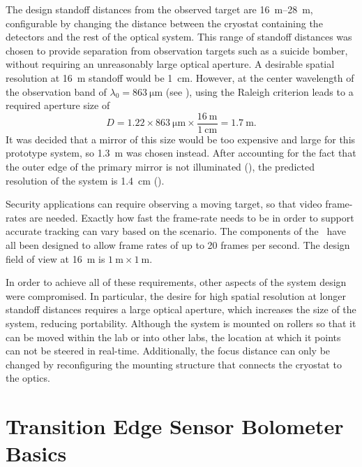 The design standoff distances from the observed target are \SIrange{16}{28}{\m}, configurable by changing the distance between the cryostat containing the detectors and the rest of the optical system.
This range of standoff distances was chosen to provide separation from observation targets such as a suicide bomber, without requiring an unreasonably large optical aperture.
A desirable spatial resolution at \SI{16}{\m} standoff would be \SI{1}{\cm}.
However, at the center wavelength of the observation band of $\lambda_0 = \SI{863}{\um}$ (see ), using the Raleigh criterion  leads to a required aperture size of
\begin{equation}
  D = 1.22 \times \SI{863}{\um} \times \frac{\SI{16}{\m}}{\SI{1}{\cm}} = \SI{1.7}{\m}.
\end{equation}
It was decided that a mirror of this size would be too expensive and large for this prototype system, so \SI{1.3}{\m} was chosen instead.
After accounting for the fact that the outer edge of the primary mirror is not illuminated (), the predicted resolution of the system is \SI{1.4}{\cm} ().

Security applications can require observing a moving target, so that video frame-rates are needed.
Exactly how fast the frame-rate needs to be in order to support accurate tracking can vary based on the scenario.
The components of the \Imager\ have all been designed to allow frame rates of up to 20 frames per second.
The design field of view at \SI{16}{\m} is $\SI{1}{\m} \times \SI{1}{\m}$.

In order to achieve all of these requirements, other aspects of the system design were compromised.
In particular, the desire for high spatial resolution at longer standoff distances requires a large optical aperture, which increases the size of the system, reducing portability.
Although the system is mounted on rollers so that it can be moved within the lab or into other labs, the location at which it points can not be steered in real-time.
Additionally, the focus distance can only be changed by reconfiguring the mounting structure that connects the cryostat to the optics.

\section{Transition Edge Sensor Bolometer Basics} \label{sec:ch2-tes-basics}

